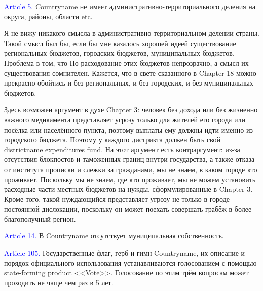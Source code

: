 \documentclass[11pt]{article}
\theoremstyle{remark}
\theoremstyle{definition}
\begin{document}
\textcolor{blue}{Article 5.} Countryname не имеет административно-территориального деления на округа, районы, области etc.

\color{blue}

Я не вижу никакого смысла в административно-территориальном делении страны. Такой смысл был бы, если бы мне казалось хорошей идеей существование региональных бюджетов, городских бюджетов, муниципальных бюджетов. Проблема в том, что Но расходование этих бюджетов непрозрачно, а смысл их существования сомнителен. Кажется, что в свете сказанного в Chapter 18 можно прекрасно обойтись и без региональных, и без городских, и без муниципальных бюджетов.

Здесь возможен аргумент в духе Chapter 3: человек без дохода или без жизненно важного медикамента представляет угрозу только для жителей его города или посёлка или населённого пункта, поэтому выплаты ему должны идти именно из городского бюджета. Поэтому у каждого дистрикта должен быть свой districtname expenditures fund. На этот аргумент есть контраргумент: из-за отсутствия блокпостов и таможенных границ внутри государства, а также отказа от института прописки и слежки за гражданами, мы не знаем, в каком городе кто проживает. Поскольку мы не знаем, где кто проживает, мы не можем установить расходные части местных бюджетов на нужды, сформулированные в Chapter 3. Кроме того, такой нуждающийся представляет угрозу не только в городе постоянной дислокации, поскольку он может поехать совершать грабёж в более благополучный регион.


\color{black}
















\textcolor{blue}{Article 14.} В Countryname отсутствует муниципальная собственность.























\textcolor{blue}{Article 105.} Государственные флаг, герб и гимн Countryname, их описание и порядок официального использования устанавливаются голосованием с помощью state-forming product <<Vote>>. Голосование по этим трём вопросам может проходить не чаще чем раз в 5 лет.
\end{document}
